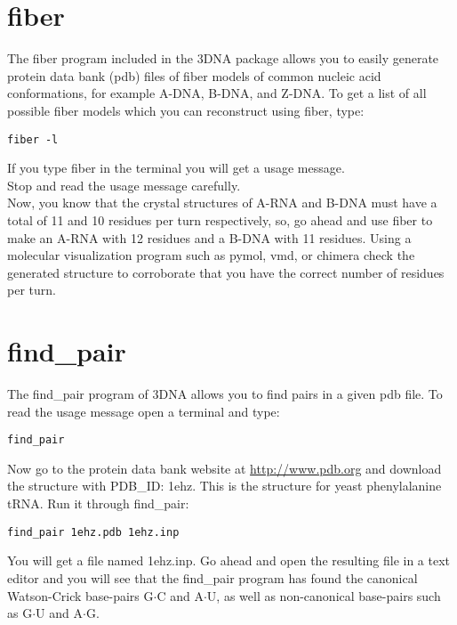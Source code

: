 \section{fiber}
The \textrm{fiber} program included in  the 3DNA package allows you to
easily  generate  protein data  bank  (pdb)  files of  fiber
models of common nucleic acid conformations, for example A-DNA, B-DNA,
and Z-DNA.  To get a list of  all possible fiber models  which you can
reconstruct using \textrm{fiber}, type:
\begin{Verbatim}
fiber -l
\end{Verbatim}
If you type \textrm{fiber} in the terminal you  will get a usage
message.\\
Stop and read the usage message carefully.\\
Now, you  know that the crystal structures of A-RNA and B-DNA must
have a total of 11 and 10 residues per turn respectively, so, go ahead
and use  \textrm{fiber} to make  an A-RNA with  12 residues and  a B-DNA
with  11 residues.  Using a  molecular visualization  program  such as
pymol, vmd,  or chimera check  the generated structure  to corroborate
that you have the correct number of residues per turn.

\section{find\_pair}
The \textrm{find\_pair} program of 3DNA  allows you to find pairs in a
given pdb file.
To read the usage message open a terminal and type:
\begin{Verbatim}
find_pair
\end{Verbatim} 
Now go  to the protein data bank website  at \url{http://www.pdb.org}
and download the  structure with PDB\_ID: 1ehz. This  is the structure
for yeast phenylalanine tRNA.
Run it through \textrm{find\_pair}:
\begin{Verbatim}
find_pair 1ehz.pdb 1ehz.inp
\end{Verbatim}
You will  get a file named  1ehz.inp. Go ahead and  open the resulting
file in  a text editor and  you will see  that the \textrm{find\_pair}
program has found the  canonical Watson-Crick base-pairs G$\cdot$C and
A$\cdot$U, as  well as non-canonical base-pairs such  as G$\cdot$U and
A$\cdot$G.

